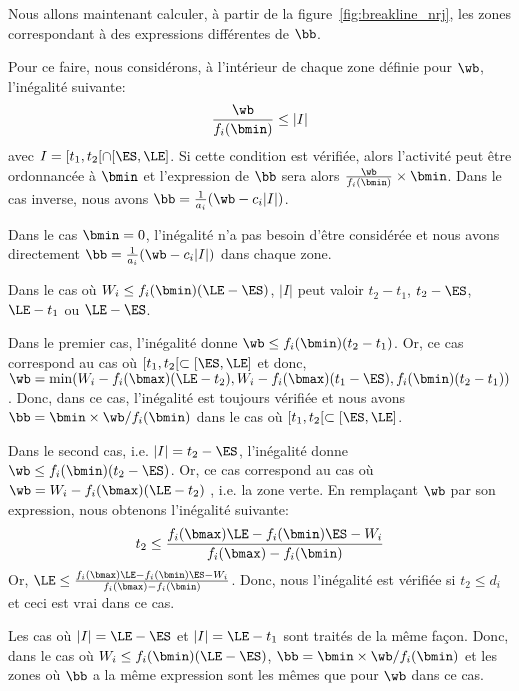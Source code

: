 Nous allons maintenant calculer, à partir de la
figure~\ref{fig:breakline_nrj}, les zones correspondant à des
expressions différentes de $\bb$. 

Pour ce faire, nous considérons, à l'intérieur de chaque zone définie
pour $\wb$, l'inégalité suivante: 
\[ \frac{\wb}{f_i(\bmin)} \le |I|\]
avec $I=[t_1,t_2[ \cap [\ES,\LE]$. Si cette condition est vérifiée,
alors l'activité peut être ordonnancée à $\bmin$ et l'expression de
$\bb$ sera alors $\frac{\wb}{f_i(\bmin)}\times \bmin$. Dans le cas
inverse, nous avons $\bb=\frac{1}{a_i}(\wb-c_i|I|)$. 

Dans le cas $\bmin=0$, l'inégalité n'a pas besoin d'être considérée et
nous avons directement $\bb=\frac{1}{a_i}(\wb-c_i|I|)$ dans chaque
zone. 

Dans le cas où $W_i\le f_i(\bmin)(\LE-\ES)$, $|I|$ peut valoir
$t_2-t_1$, $t_2-\ES$, $\LE-t_1$ ou $\LE-\ES$. 

Dans le premier cas,
l'inégalité donne $\wb \le f_i(\bmin)(t_2-t_1)$. Or, ce cas correspond
au cas où $[t_1,t_2[ \subset [\ES,\LE]$ et donc, $\wb=\min(W_i -
f_i(\bmax)(\LE-t_2), W_i - f_i(\bmax)(t_1-\ES),
f_i(\bmin)(t_2-t_1))$. Donc, dans ce cas, l'inégalité est toujours
vérifiée et nous avons $\bb = \bmin \times \wb/f_i(\bmin)$ dans le cas
où $[t_1,t_2[ \subset [\ES,\LE]$. 

Dans le second cas,
i.e. $|I|=t_2-\ES$, l'inégalité donne $\wb \le
f_i(\bmin)(t_2-\ES)$. Or, ce cas correspond au cas où $\wb = W_i -
f_i(\bmax)(\LE -t_2)$ , i.e. la zone verte. En remplaçant $\wb$ par
son expression, nous obtenons l'inégalité suivante: 
\[t_2 \le \frac{f_i(\bmax)\LE - f_i(\bmin)\ES - W_i }{f_i(\bmax) -
    f_i(\bmin)} \]
Or, $\LE  \le \frac{f_i(\bmax)\LE - f_i(\bmin)\ES - W_i }{f_i(\bmax) -
  f_i(\bmin)}$. Donc, nous l'inégalité est vérifiée si $t_2 \le d_i$
et ceci est vrai dans ce cas. 

Les cas où $|I| = \LE -\ES$ et $|I| =
\LE -t_1$ sont traités de la même façon. Donc, dans le cas où $W_i \le
f_i(\bmin) (\LE - \ES)$, $\bb=\bmin \times \wb/f_i(\bmin)$ et les
zones où $\bb$ a la même expression sont les mêmes que pour $\wb$ dans
ce cas. 




